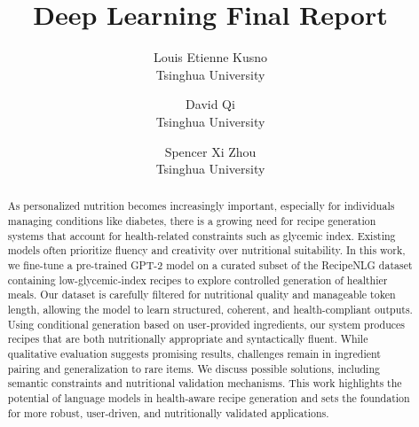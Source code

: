 \title{Deep Learning Final Report}

\author{Louis Etienne Kusno\\
Tsinghua University\\
\and
David Qi\\
Tsinghua University\\
\and
Spencer Xi Zhou\\
Tsinghua University\\
}

\maketitle

\begin{abstract}
As personalized nutrition becomes increasingly important, especially for individuals managing conditions like diabetes, there is a growing need for recipe generation systems that account for health-related constraints such as glycemic index. Existing models often prioritize fluency and creativity over nutritional suitability. In this work, we fine-tune a pre-trained GPT-2 model on a curated subset of the RecipeNLG dataset containing low-glycemic-index recipes to explore controlled generation of healthier meals. Our dataset is carefully filtered for nutritional quality and manageable token length, allowing the model to learn structured, coherent, and health-compliant outputs. Using conditional generation based on user-provided ingredients, our system produces recipes that are both nutritionally appropriate and syntactically fluent. While qualitative evaluation suggests promising results, challenges remain in ingredient pairing and generalization to rare items. We discuss possible solutions, including semantic constraints and nutritional validation mechanisms. This work highlights the potential of language models in health-aware recipe generation and sets the foundation for more robust, user-driven, and nutritionally validated applications.
\end{abstract}
